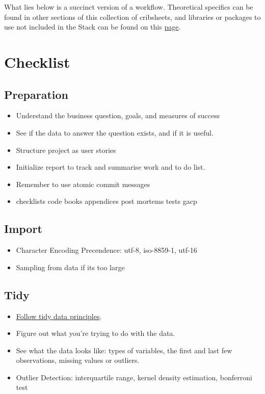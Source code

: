 \documentclass[]{book}
\begin{document}
What lies below is a succinct version of a workflow. Theoretical
specifics can be found in other sections of this collection of
cribsheets, and libraries or packages to use not included in the Stack
can be found on this
\href{https://gfleetwood.github.io/noted-resources/data_science.html}{page}.

\section{Checklist}\label{checklist}

\subsection{Preparation}\label{preparation}

\begin{itemize}
\item
  Understand the business question, goals, and measures of success
\item
  See if the data to answer the question exists, and if it is useful.
\item
  Structure project as user stories
\item
  Initialize report to track and summarise work and to do list.
\item
  Remember to use atomic commit messages
\item
  checklists \textbar{} code books \textbar{} appendices \textbar{} post
  mortems \textbar{} tests \textbar{} gacp
\end{itemize}

\subsection{Import}\label{import}

\begin{itemize}
\item
  Character Encoding Precendence: utf-8, iso-8859-1, utf-16
\item
  Sampling from data if its too large
\end{itemize}

\subsection{Tidy}\label{tidy}

\begin{itemize}
\item
  \href{http://vita.had.co.nz/papers/tidy-data.pdf}{Follow tidy data
  principles}.
\item
  Figure out what you're trying to do with the data.
\item
  See what the data looks like: types of variables, the first and last
  few observations, missing values or outliers.
\item
  Outlier Detection: interquartile range, kernel density estimation,
  bonferroni test
\end{itemize}
\end{document}
